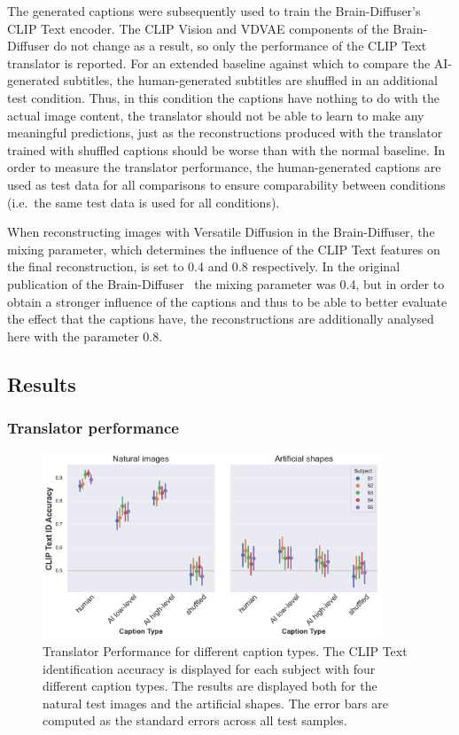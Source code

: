 The generated captions were subsequently used to train the Brain-Diffuser's CLIP Text encoder. The CLIP Vision and VDVAE components of the Brain-Diffuser do not change as a result, so only the performance of the CLIP Text translator is reported. For an extended baseline against which to compare the AI-generated subtitles, the human-generated subtitles are shuffled in an additional test condition. Thus, in this condition the captions have nothing to do with the actual image content, the translator should not be able to learn to make any meaningful predictions, just as the reconstructions produced with the translator trained with shuffled captions should be worse than with the normal baseline. In order to measure the translator performance, the human-generated captions are used as test data for all comparisons to ensure comparability between conditions (i.e.\ the same test data is used for all conditions). 

When reconstructing images with Versatile Diffusion in the Brain-Diffuser, the mixing parameter, which determines the influence of the CLIP Text features on the final reconstruction, is set to 0.4 and 0.8 respectively. In the original publication of the Brain-Diffuser~\cite{ozcelikNaturalSceneReconstruction2023} the mixing parameter was 0.4, but in order to obtain a stronger influence of the captions and thus to be able to better evaluate the effect that the captions have, the reconstructions are additionally analysed here with the parameter 0.8.


\subsection{Results}

\subsubsection{Translator performance}

\begin{figure}[ht]
    \centering
    \includegraphics[width=0.9\textwidth]{plots/aicap_translator.png}
    \caption[Experiment 2: Translator performance]{Translator Performance for different caption types. The CLIP Text identification accuracy is displayed for each subject with four different caption types. The results are displayed both for the natural test images and the artificial shapes. The error bars are computed as the standard errors across all test samples.}\label{fig:aicap_translator}
\end{figure}

